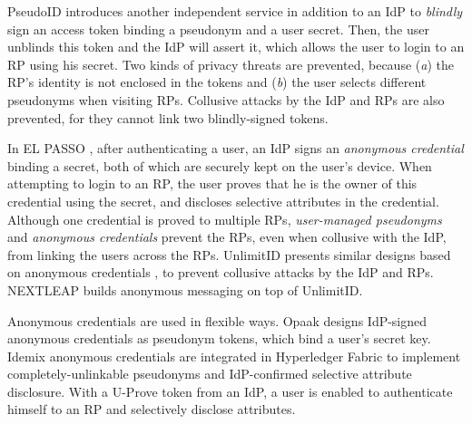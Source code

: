 PseudoID \cite{PseudoID} introduces another independent service in addition to an IdP to \emph{blindly} sign \cite{blind-sign}
    an access token binding a pseudonym and a user secret.
Then, the user unblinds this token and the IdP will assert it,
    which allows the user to login to an RP using his secret.
Two kinds of privacy threats are prevented, because (\emph{a}) the RP's identity is not enclosed in the tokens
    and (\emph{b}) the user selects different pseudonyms when visiting RPs.
Collusive attacks by the IdP and RPs are also prevented,
    for they cannot link two blindly-signed tokens.


In EL PASSO \cite{ELPASSO}, after authenticating a user,
    an IdP signs an \emph{anonymous credential} \cite{anon-credential} binding a secret,
         both of which are securely kept on the user's device.
When attempting to login to an RP,
    the user proves that he is the owner of this credential using the secret,
        and discloses selective attributes in the credential.
Although one credential is proved to multiple RPs,
        \emph{user-managed pseudonyms} and \emph{anonymous credentials} prevent the RPs, even when collusive with the IdP, from linking the users across the RPs.
UnlimitID \cite{UnlimitID} presents similar designs based on anonymous credentials \cite{anon-credential},
        to prevent collusive attacks by the IdP and RPs.
NEXTLEAP \cite{nextleap} builds anonymous messaging on top of UnlimitID.


Anonymous credentials \cite{anon-credential-2001,anon-credential} are used in flexible ways.
Opaak \cite{Opaak} designs IdP-signed anonymous credentials %
 as pseudonym tokens,
    which bind a user's secret key.
Idemix anonymous credentials \cite{idemix}
 are integrated in Hyperledger Fabric \cite{hyperledge-idemix} to implement completely-unlinkable pseudonyms
        and IdP-confirmed selective attribute disclosure.
With a U-Prove token \cite{uprov,uprove-conference} from an IdP,
    a user is enabled to authenticate himself to an RP and selectively disclose attributes.

